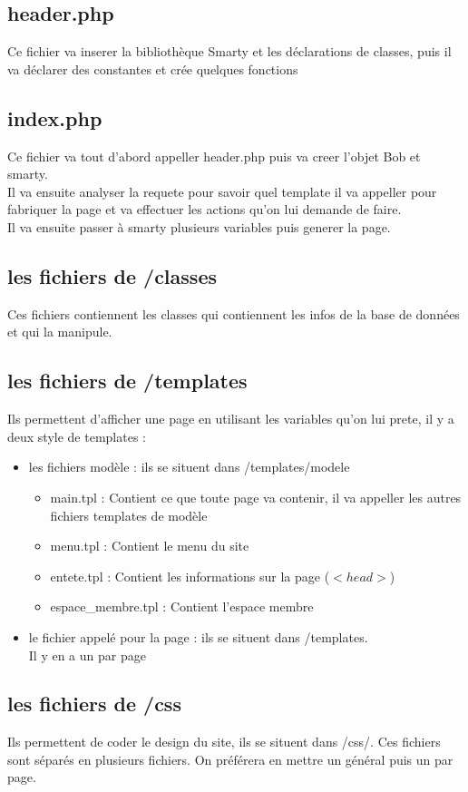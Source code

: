 \subsection{header.php}
				Ce fichier va inserer la bibliothèque Smarty et les déclarations de classes, puis il va déclarer des constantes et crée quelques fonctions  
			\subsection{index.php}
				Ce fichier va tout d'abord appeller header.php puis va creer l'objet Bob et smarty.\\
				Il va ensuite analyser la requete pour savoir quel template il va appeller pour fabriquer la page et va effectuer les actions qu'on lui demande de faire.\\
				Il va ensuite passer à smarty plusieurs variables puis generer la page.
			\subsection{les fichiers de /classes}
				Ces fichiers contiennent les classes qui contiennent les infos de la base de données et qui la manipule.
			\subsection{les fichiers de /templates}
				Ils permettent d'afficher une page en utilisant les variables qu'on lui prete, il y a deux style de templates : 
				\begin{itemize}
				\item les fichiers modèle : ils se situent dans /templates/modele
				\begin{itemize}
					\item main.tpl : Contient ce que toute page va contenir, il va appeller les autres fichiers templates de modèle
					\item menu.tpl : Contient le menu du site
					\item entete.tpl  : Contient les informations sur la page ($<head>$)
					\item espace\_membre.tpl : Contient l'espace membre\\
				\end{itemize}
					
				\item le fichier appelé pour la page : ils se situent dans /templates.\\
				Il y en a un par page
				\end{itemize}
			\subsection{les fichiers de /css}
				Ils permettent de coder le design du site, ils se situent dans /css/. Ces fichiers sont séparés en plusieurs fichiers. On préférera en mettre un général puis un par page.
			
			